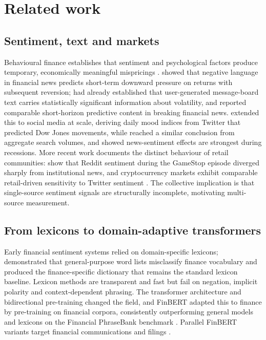 \documentclass[12pt,a4paper]{article}
\begin{document}
\section{Related work}\label{sec:related}
\subsection{Sentiment, text and markets}
Behavioural finance establishes that sentiment and psychological factors produce
temporary, economically meaningful mispricings \citep{baker2006}. \citet{tetlock2007}
showed that negative language in financial news predicts short-term downward
pressure on returns with subsequent reversion; \citet{antweiler2004} had already
established that user-generated message-board text carries statistically
significant information about volatility, and \citet{schumaker2009} reported
comparable short-horizon predictive content in breaking financial news.
\citet{bollen2011} extended this to social
media at scale, deriving daily mood indices from Twitter that predicted Dow Jones
movements, while \citet{da2015} reached a similar conclusion from aggregate search
volumes, and \citet{garcia2013} showed news-sentiment effects are strongest during
recessions. More recent work documents the distinct behaviour of retail
communities: \citet{long2023} show that Reddit sentiment during the GameStop
episode diverged sharply from institutional news, and cryptocurrency markets
exhibit comparable retail-driven sensitivity to Twitter sentiment
\citep{kraaijeveld2020}. The collective implication is that single-source sentiment
signals are structurally incomplete, motivating multi-source measurement.

\subsection{From lexicons to domain-adaptive transformers}
Early financial sentiment systems relied on domain-specific lexicons;
\citet{loughran2011} demonstrated that general-purpose word lists misclassify
finance vocabulary and produced the finance-specific dictionary that remains the
standard lexicon baseline. Lexicon methods are transparent and fast but fail on
negation, implicit polarity and context-dependent phrasing. The transformer
architecture \citep{vaswani2017} and bidirectional pre-training \citep{devlin2019}
changed the field, and FinBERT \citep{araci2019} adapted this to finance by
pre-training on financial corpora, consistently outperforming general models and
lexicons on the Financial PhraseBank benchmark \citep{malo2014}. Parallel FinBERT
variants target financial communications and filings
\citep{yang2020,huang2023}.
\end{document}
